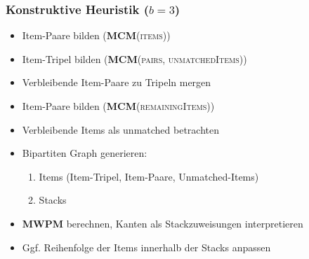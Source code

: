 \documentclass{beamer}
\begin{document}
\begin{frame}
\frametitle{Konstruktive Heuristik ($b = 3$)}

\begin{itemize}
  \item Item-Paare bilden (\textsc{\textbf{MCM}(items)})
  \item Item-Tripel bilden (\textsc{\textbf{MCM}(pairs, unmatchedItems)})
  \item Verbleibende Item-Paare zu Tripeln mergen
  \item Item-Paare bilden (\textsc{\textbf{MCM}(remainingItems)})
  \item Verbleibende Items als unmatched betrachten
  \item Bipartiten Graph generieren:
  \begin{enumerate}
    \item Items (Item-Tripel, Item-Paare, Unmatched-Items)
    \item Stacks
  \end{enumerate}
  \item \textsc{\textbf{MWPM}} berechnen, Kanten als Stackzuweisungen interpretieren
  \item Ggf. Reihenfolge der Items innerhalb der Stacks anpassen
\end{itemize}
\end{frame}
\end{document}
